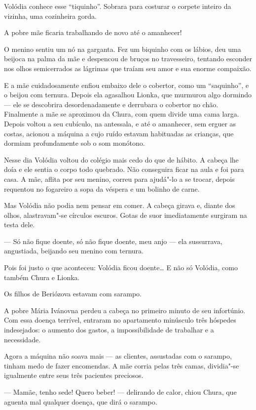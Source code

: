 Volódia conhece esse ``tiquinho''. Sobrara para costurar o corpete
inteiro da vizinha, uma cozinheira gorda.

A pobre mãe ficaria trabalhando de novo até o amanhecer!

O menino sentiu um nó na garganta. Fez um biquinho com os lábios, deu
uma beijoca na palma da mãe e despencou de bruços no travesseiro,
tentando esconder nos olhos semicerrados as lágrimas que traíam seu amor
e sua enorme compaixão.

E a mãe cuidadosamente enfiou embaixo dele o cobertor, como um
``saquinho'', e o beijou com ternura. Depois ela agasalhou Lionka, que
murmurou algo dormindo --- ele se descobrira desordenadamente e
derrubara o cobertor no chão. Finalmente a mãe se aproximou da Chura,
com quem divide uma cama larga. Depois voltou a seu cubículo, na
antessala, e até o amanhecer, sem erguer as costas, acionou a máquina a
cujo ruído estavam habituadas as crianças, que dormiam profundamente sob
o som monótono.

\asterisc

Nesse dia Volódia voltou do colégio mais cedo do que de hábito. A cabeça
lhe doía e ele sentia o corpo todo quebrado. Não conseguira ficar na
aula e foi para casa. A mãe, aflita por seu menino, correu para ajudá"-lo
a se trocar, depois requentou no fogareiro a sopa da véspera e um
bolinho de carne.

Mas Volódia não podia nem pensar em comer. A cabeça girava e, diante dos
olhos, alastravam"-se círculos escuros. Gotas de suor imediatamente
surgiram na testa dele.

--- Só não fique doente, só não fique doente, meu anjo --- ela
sussurrava, angustiada, beijando seu menino com ternura.

Pois foi justo o que aconteceu: Volódia ficou doente\ldots{} E não só
Volódia, como também Chura e Lionka.

Os filhos de Beriózova estavam com sarampo.

A pobre Mária Ivánovna perdeu a cabeça no primeiro minuto de seu
infortúnio. Com essa doença terrível, entraram no apartamento minúsculo
três hóspedes indesejados: o aumento dos gastos, a impossibilidade de
trabalhar e a necessidade.

Agora a máquina não soava mais --- as clientes, assustadas com o
sarampo, tinham medo de fazer encomendas. A mãe corria pelas três camas,
dividia"-se igualmente entre seus três pacientes preciosos.

--- Mamãe, tenho sede! Quero beber! --- delirando de calor, chiou Chura,
que aguenta mal qualquer doença, que dirá o sarampo.

